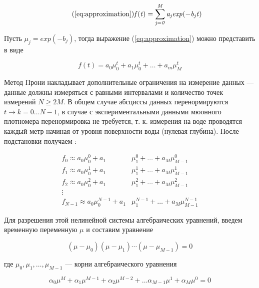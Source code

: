 \begin{equation}
  \tag{\ref{eq:approximation}}
  \mathit{ f(t)  = \displaystyle\sum_{j=0}^M a_j exp(-b_j t) }  
\end{equation}

Пусть $\mu_j = exp(-b_j)$, тогда выражение (\ref{eq:approximation}) можно представить в виде 

\begin{equation}
  \label{eq:prony_nonlinear}
  \mathit{ f(t)  = a_0 \mu_0^t + a_1 \mu_0^t + \ldots + a_m \mu_M^t }
\end{equation}


Метод Прони накладывает дополнительные ограничения на измерение данных --- данные должны измеряться с равными 
интервалами и количество точек измерений $N \geq 2M$. В общем случае абсциссы данных перенормируются $t \to k = 0 \ldots N-1$, 
в случае с экспериментальными данными мюонного плотномера перенормировка не требуется, т. к. измерения на воде
проводятся каждый метр начиная от уровня поверхности воды (нулевая глубина). После подстановки получаем :

\begin{equation}
  \begin{split}
  f_0  \approx a_0 \mu_0^0 + a_1 & \mu_1^0 + \ldots + a_M \mu_{M-1}^0 \\
  f_1  \approx a_0 \mu_0^1 + a_1 & \mu_1^1 + \ldots + a_M \mu_{M-1}^1  \\
  f_2  \approx a_0 \mu_0^2 + a_1 & \mu_1^2 + \ldots + a_M \mu_{M-1}^2  \\
  \vdots & \\
  f_{N-1} \approx a_0 \mu_{0}^{N-1} + a_1 & \mu_{1}^{N-1} + \ldots + a_M \mu_{M-1}^{N-1}
  \end{split}
  \label{eq:prony_system}
\end{equation}

Для разрешения этой нелинейной системы алгебраических уравнений, введем временную переменную $\mu$ и составим уравнение 

\begin{equation}
\label{eq:prony_algebra}
	\left( \mu - \mu_0 \right) 
	\left( \mu - \mu_1 \right) \cdots 
	\left( \mu - \mu_{M-1} \right) = 0  
\end{equation}

где $\mu_0,\mu_1, \ldots , \mu_{M-1}$ --- корни алгебраического
уравнения 

\begin{equation}
	\label{eq:prony_alpha}
	\alpha_0 \mu ^ M + 
	\alpha_1 \mu ^ {M-1} + 
	\alpha_2 \mu ^ {M-2} + \ldots
	\alpha_{M-1} \mu ^ 1 + 
	\alpha_{M} \mu ^ 0 = 0
\end{equation}

